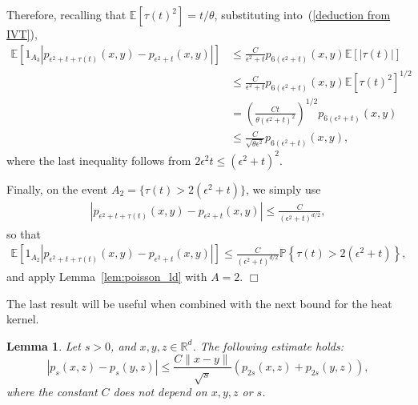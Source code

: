 \documentclass[12pt]{article}
\newenvironment {proof}{{\noindent\bf Proof }}{\hfill $\Box$ \medskip}
\newtheorem{lemma}[theorem]{Lemma}
\newcommand{\IP}{\mathbb P}
\newcommand{\IE}{\mathbb E}
\newcommand{\IR}{\mathbb R}
\numberwithin{equation}{section}
\begin{document}
\begin{proof}
    Therefore, recalling that $\IE[\tau(t)^2] = t / \theta$, substituting 
into~(\ref{deduction from IVT}),
    \begin{align*}
        \IE\left[
            1_{A_3}
            \left|
                p_{\epsilon^2 + t + \tau(t)}(x, y)
                -
                p_{\epsilon^2 + t}(x, y)
            \right|
        \right]
        &\le
            \frac{C}{\epsilon^2 + t}
                p_{6(\epsilon^2 + t)}(x, y)
            \IE\left[|\tau(t)|\right]
        \\ &\le
            \frac{C}{\epsilon^2 + t}
                p_{6(\epsilon^2 + t)}(x, y)
            \IE\left[\tau(t)^2\right]^{1/2}
        \\ &=
            \left( \frac{Ct}{\theta(\epsilon^2 + t)^2} \right)^{1/2}
                p_{6(\epsilon^2 + t)}(x, y)
        \\ &\le
            \frac{C}{\sqrt{\theta \epsilon^2}}
                p_{6(\epsilon^2 + t)}(x, y) ,
    \end{align*}
    where the last inequality follows from $2 \epsilon^2 t \le (\epsilon^2 + t)^2$.

    Finally, on the event $A_2 = \{\tau(t) > 2(\epsilon^2 + t)\}$,
    we simply use
    \begin{align*}
        \left|
            p_{\epsilon^2 + t + \tau(t)}(x, y)
            -
            p_{\epsilon^2 + t}(x, y)
        \right|
        \le
        \frac{C}{(\epsilon^2 + t)^{d/2}} ,
    \end{align*}
    so that
    \begin{align*}
        \IE\left[
        1_{A_2}
        \left|
            p_{\epsilon^2 + t + \tau(t)}(x, y)
            -
            p_{\epsilon^2 + t}(x, y)
        \right|
        \right]
        \le
        \frac{C}{(\epsilon^2 + t)^{d/2}}
        \IP\left\{
            \tau(t) > 2 (\epsilon^2 + t)
        \right\} ,
    \end{align*}
    and apply Lemma~\ref{lem:poisson_ld}
    with $A=2$.
\end{proof}

The last result will be useful when combined with the next bound for the heat kernel.

\begin{lemma}
    \label{Lemma:ContinuityHS}
Let $s>0$, and $x, y, z\in \IR^d$. The following estimate holds:
\[
    |p_s(x,z) - p_s(y,z)|
    \leq
    \frac{C\|x-y\|}{\sqrt{s}} \left(p_{2s}(x,z) + p_{2s}(y,z)\right) ,
\]
where the constant $C$ does not depend on $x,y,z$ or $s$.
\end{lemma}
\end{document}
